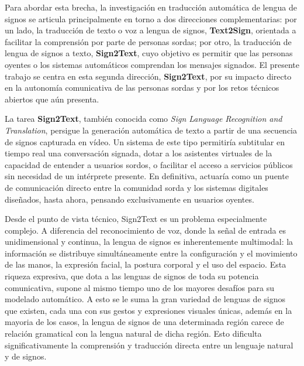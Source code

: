 Para abordar esta brecha, la investigación en traducción automática de lengua de signos se articula principalmente en torno a dos direcciones complementarias: por un lado, la traducción de texto o voz a lengua de signos, \textbf{Text2Sign}, orientada a facilitar la comprensión por parte de personas sordas; por otro, la traducción de lengua de signos a texto, \textbf{Sign2Text}, cuyo objetivo es permitir que las personas oyentes o los sistemas automáticos comprendan los mensajes signados. El presente trabajo se centra en esta segunda dirección, \textbf{Sign2Text}, por su impacto directo en la autonomía comunicativa de las personas sordas y por los retos técnicos abiertos que aún presenta.

La tarea \textbf{Sign2Text}, también conocida como \textit{Sign Language Recognition and Translation}, persigue la generación automática de texto a partir de una secuencia de signos capturada en vídeo. Un sistema de este tipo permitiría subtitular en tiempo real una conversación signada, dotar a los asistentes virtuales de la capacidad de entender a usuarios sordos, o facilitar el acceso a servicios públicos sin necesidad de un intérprete presente. En definitiva, actuaría como un puente de comunicación directo entre la comunidad sorda y los sistemas digitales diseñados, hasta ahora, pensando exclusivamente en usuarios oyentes.

Desde el punto de vista técnico, Sign2Text es un problema especialmente complejo. A diferencia del reconocimiento de voz, donde la señal de entrada es unidimensional y continua, la lengua de signos es inherentemente multimodal: la información se distribuye simultáneamente entre la configuración y el movimiento de las manos, la expresión facial, la postura corporal y el uso del espacio. Esta riqueza expresiva, que dota a las lenguas de signos de toda su potencia comunicativa, supone al mismo tiempo uno de los mayores desafíos para su modelado automático. A esto se le suma la gran variedad de lenguas de signos que existen, cada una con sus gestos y expresiones visuales únicas, además en la mayoria de los casos, la lengua de signos de una determinada región carece de relación gramatical con la lengua natural de dicha región. Esto dificulta significativamente la comprensión y traducción directa entre un lenguaje natural y de signos.

